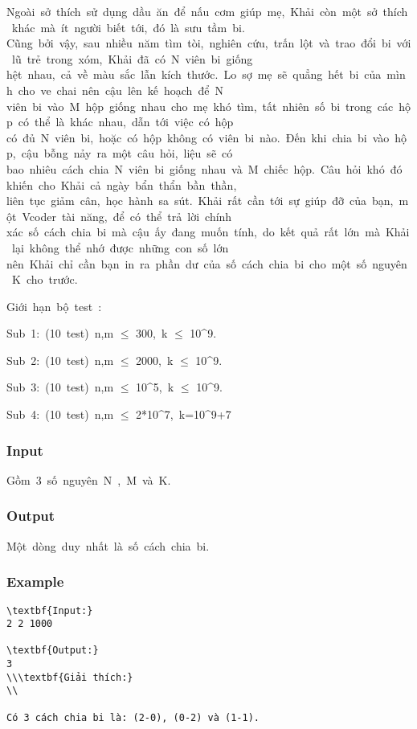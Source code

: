 



   Ngoài sở thích sử dụng dầu ăn để nấu cơm giúp mẹ, Khải còn một sở thích khác mà ít người biết tới, đó là sưu tầm bi. Cũng bởi vậy, sau nhiều năm tìm tòi, nghiên cứu, trấn lột và trao đổi bi với lũ trẻ trong xóm, Khải đã có N viên bi giống hệt nhau, cả về màu sắc lẫn kích thước. Lo sợ mẹ sẽ quẳng hết bi của mình cho ve chai nên cậu lên kế hoạch để N viên bi vào M hộp giống nhau cho mẹ khó tìm, tất nhiên số bi trong các hộp có thể là khác nhau, dẫn tới việc có hộp có đủ N viên bi, hoặc có hộp không có viên bi nào. Đến khi chia bi vào hộp, cậu bỗng nảy ra một câu hỏi, liệu sẽ có bao nhiêu cách chia N viên bi giống nhau và M chiếc hộp. Câu hỏi khó đó khiến cho Khải cả ngày bẩn thẩn bần thần, liên tục giảm cân, học hành sa sút. Khải rất cần tới sự giúp đỡ của bạn, một Vcoder tài năng, để có thể trả lời chính xác số cách chia bi mà cậu ấy đang muốn tính, do kết quả rất lớn mà Khải lại không thể nhớ được những con số lớn nên Khải chỉ cần bạn in ra phần dư của số cách chia bi cho một số nguyên K cho trước.  



   Giới hạn bộ test :  

   Sub 1: (10 test) n,m $\le$ 300, k $\le$ 10\textasciicircum9.  

   Sub 2: (10 test) n,m $\le$ 2000, k $\le$ 10\textasciicircum9.  

   Sub 3: (10 test) n,m $\le$ 10\textasciicircum5, k $\le$ 10\textasciicircum9.  

   Sub 4: (10 test) n,m $\le$ 2*10\textasciicircum7, k=10\textasciicircum9+7  



\subsubsection{   Input  }

   Gồm 3 số nguyên N , M và K.  

\subsubsection{   Output  }

   Một dòng duy nhất là số cách chia bi.  

\subsubsection{   Example  }
\begin{verbatim}
\textbf{Input:}
2 2 1000

\textbf{Output:}
3
\\\textbf{Giải thích:}
\\

Có 3 cách chia bi là: (2-0), (0-2) và (1-1).\end{verbatim}
